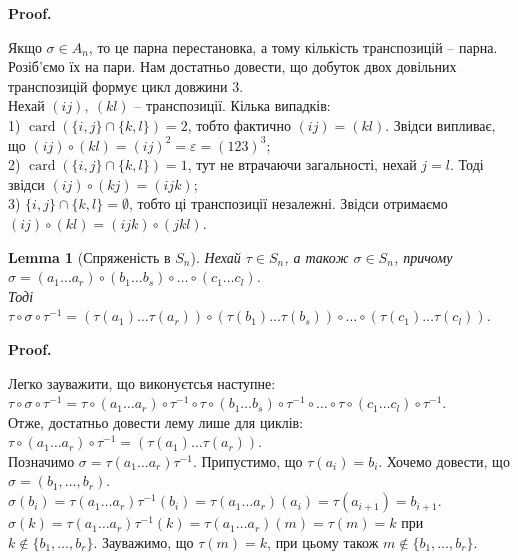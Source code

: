 \documentclass[a4paper, 10pt]{article}
\makeatletter
\theoremstyle{theoremdd}
\theoremstyle{theoremdd}
\theoremstyle{theoremdd}
\theoremstyle{theoremdd}
\theoremstyle{theoremdd}
\theoremstyle{theoremdd}
\theoremstyle{theoremdd}
\theoremstyle{theoremdd}
\theoremstyle{theoremdd}
\theoremstyle{theoremdd}
\theoremstyle{theoremdd}
\theoremstyle{theoremdd}
\theoremstyle{theoremdd}
\newtheorem{lemma}[theorem]{Lemma}
\theoremstyle{theoremdd}
\theoremstyle{theoremdd}
\renewenvironment{proof}[1][Proof.\\]{\par
\pushQED{\hfill \qed}%
\normalfont \topsep6\p@\@plus6\p@\relax
\trivlist
\item\relax
{\bfseries
#1\@addpunct{.}}\hspace\labelsep\ignorespaces
}{%
\popQED\endtrivlist\@endpefalse
}
\DeclareMathOperator{\card}{card}
\makeatother
\begin{document}
\begin{proof}
Якщо $\sigma \in A_n$, то це парна перестановка, а тому кількість транспозицій -- парна. Розіб'ємо їх на пари. Нам достатньо довести, що добуток двох довільних транспозицій формує цикл довжини $3$.\\
Нехай $(ij),\ (kl)$ -- транспозиції. Кілька випадків:\\
1) $\card(\{i,j\} \cap \{k,l\}) = 2$, тобто фактично $(ij) = (kl)$. Звідси випливає, що $(ij) \circ (kl) = (ij)^2 = \varepsilon = (123)^3$;\\
2) $\card(\{i,j\} \cap \{k,l\}) = 1$, тут не втрачаючи загальності, нехай $j = l$. Тоді звідси $(ij) \circ (kj) = (ijk)$;\\
3) $\{i,j\} \cap \{k,l\} = \emptyset$, тобто ці транспозиції незалежні. Звідси отримаємо $(ij) \circ (kl) = (ijk) \circ (jkl)$.
\end{proof}

\begin{lemma}[Спряженість в $S_n$]
Нехай $\tau \in S_n$, а також $\sigma \in S_n$, причому\\
$\sigma = (a_1 \dots a_r) \circ (b_1 \dots b_s) \circ \dots \circ (c_1 \dots c_l)$.\\
Тоді $\tau \circ \sigma \circ \tau^{-1} = (\tau(a_1)\dots \tau(a_r)) \circ (\tau(b_1)\dots \tau(b_s)) \circ \dots \circ (\tau(c_1)\dots \tau(c_l))$.
\end{lemma}

\begin{proof}
Легко зауважити, що виконуєтсья наступне:\\
$\tau \circ \sigma \circ \tau^{-1} = \tau \circ (a_1 \dots a_r) \circ \tau^{-1} \circ \tau \circ (b_1 \dots b_s) \circ \tau^{-1} \circ \dots \circ \tau \circ (c_1 \dots c_l) \circ \tau^{-1}$.\\
Отже, достатньо довести лему лише для циклів:\\
$\tau \circ (a_1 \dots a_r) \circ \tau^{-1} = (\tau(a_1) \dots \tau(a_r))$.\\
Позначимо $\sigma = \tau (a_1 \dots a_r) \tau^{-1}$. Припустимо, що $\tau(a_i) = b_i$. Хочемо довести, що $\sigma = (b_1,\dots,b_r)$.\\
$\sigma(b_i) = \tau (a_1 \dots a_r) \tau^{-1} (b_{i}) = \tau (a_1 \dots a_r) (a_i) = \tau (a_{i+1}) = b_{i+1}$.\\
$\sigma(k) = \tau (a_1 \dots a_r) \tau^{-1}(k) = \tau (a_1 \dots a_r) (m) = \tau (m) = k$ при $k \notin \{b_1,\dots,b_r\}$. Зауважимо, що $\tau(m) = k$, при цьому також $m \notin \{b_1,\dots,b_r\}$.
\end{proof}
\end{document}
